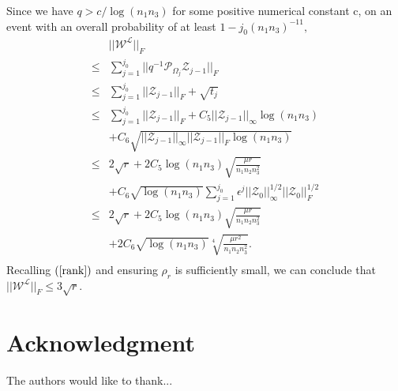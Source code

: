 \documentclass[journal,transmag]{IEEEtran}
\theoremstyle{plain}
\begin{document}
Since we have $q > c/\log(n_1 n_3)$ for some positive numerical constant c, on an event with an overall probability of at least $1- j_0 (n_1 n_3)^{-11},$
\begin{equation}
\begin{split}
&||\mathcal{W}^{\mathcal{L}}||_F \\
\le & \sum_{j=1}^{j_0}||q^{-1}\mathcal{P}_{\Omega_j}\mathcal{Z}_{j-1}||_F \\
\le &\sum_{j=1}^{j_0} ||\mathcal{Z}_{j-1}||_F + \sqrt{t_j} \\
\le & \sum_{j=1}^{j_0} ||\mathcal{Z}_{j-1}||_F + C_5 ||\mathcal{Z}_{j-1}||_{\infty} \log(n_1 n_3) \\
& + C_6 \sqrt{||\mathcal{Z}_{j-1}||_{\infty}||\mathcal{Z}_{j-1}||_F\log(n_1 n_3)} \\
\le & 2\sqrt{r} + 2C_5 \log(n_1 n_3)\sqrt{\frac{\mu r}{n_1 n_2 n_3^2}} \\
& + C_6 \sqrt{\log(n_1 n_3)} \sum^{j_0}_{j=1} \epsilon^j ||\mathcal{Z}_0||_{\infty}^{1/2}||\mathcal{Z}_0||_{F}^{1/2} \\
\le & 2\sqrt{r} + 2C_5 \log(n_1 n_3)\sqrt{\frac{\mu r}{n_1 n_2 n_3^2}} \\
& + 2 C_6 \sqrt{\log(n_1 n_3)} \sqrt[4]{\frac{\mu r^2}{n_1 n_2 n_3^2}}. \\
\end{split}
\end{equation}
Recalling $(\ref{rank})$ and ensuring $\rho_r$ is sufficiently small, we can conclude that $||\mathcal{W}^{\mathcal{L}}||_F \le 3\sqrt{r}.$

\section*{Acknowledgment}


The authors would like to thank...


\ifCLASSOPTIONcaptionsoff
  \newpage
\fi
\end{document}
